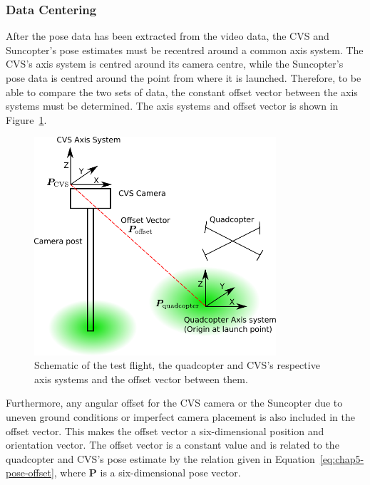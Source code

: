 \subsubsection{Data Centering}
\label{sec:chap5-data-centring}

After the pose data has been extracted from the video data, the CVS and Suncopter's pose estimates must be recentred around a common axis system. The CVS's axis system is centred around its camera centre, while the Suncopter's pose data is centred around the point from where it is launched. Therefore, to be able to compare the two sets of data, the constant offset vector between the axis systems must be determined. The axis systems and offset vector is shown in Figure~\ref{fig:chap5-flight-test-schem}.

\begin{figure}
  \centering
  \includegraphics[width=0.8\textwidth]{figures/chapter5/test_flight_schem}
  \caption[Shematic of the test flight layout.]{Schematic of the test flight, the quadcopter and CVS's respective axis systems and the offset vector between them.}
\label{fig:chap5-flight-test-schem}
\end{figure}

Furthermore, any angular offset for the CVS camera or the Suncopter due to uneven ground conditions or imperfect camera placement is also included in the offset vector. This makes the offset vector a six-dimensional position and orientation vector. The offset vector is a constant value and is related to the quadcopter and CVS's pose estimate by the relation given in Equation~\ref{eq:chap5-pose-offset}, where $\bm{P}$ is a six-dimensional pose vector. 

